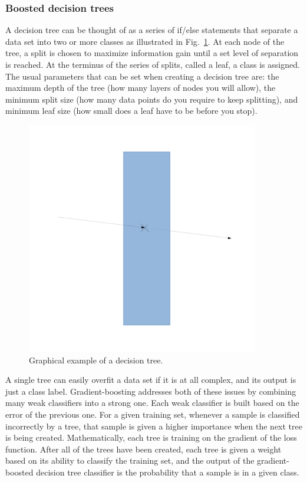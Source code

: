   \subsubsection{Boosted decision trees}\label{sec:decisiontrees}
    A decision tree can be thought of as a series of if/else statements that
    separate a data set into two or more classes as illustrated in
    Fig.~\ref{fig:dtree}. At each node of the tree, a split is chosen to
    maximize information gain until a set level of separation is reached.  At
    the terminus of the series of splits, called a leaf, a class is assigned.
    The usual parameters that can be set when creating a decision tree are: the
    maximum depth of the tree (how many layers of nodes you will allow), the
    minimum split size (how many data points do you require to keep splitting),
    and minimum leaf size (how small does a leaf have to be before you stop). 
    \begin{figure}[h]
      \centering
      \includegraphics[angle=0,width=4in]{figures/bz.pdf}
      \caption{Graphical example of a decision tree.}
      \label{fig:dtree}
    \end{figure}
    
    A single tree can easily overfit a data set if it is at all complex, and
    its output is just a class label. Gradient-boosting addresses both of these
    issues by combining many weak classifiers into a strong one. Each weak
    classifier is built based on the error of the previous one. For a given
    training set, whenever a sample is classified incorrectly by a tree, that
    sample is given a higher importance when the next tree is being created.
    Mathematically, each tree is training on the gradient of the loss function.
    After all of the trees have been created, each tree is given a weight based
    on its ability to classify the training set, and the output of the
    gradient-boosted decision tree classifier is the probability that a sample
    is in a given class.
    
